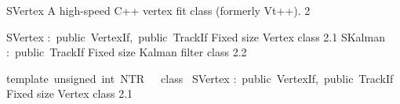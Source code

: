 \documentclass{article}
\begin{document}
\begin{cxxentry}
{}
        {SVertex}
        {}
        {A high-speed C++ vertex fit class (formerly Vt++).
}
        {2}
\begin{cxxnames}
        {SVertex}
        {:\ public\ VertexIf,\ public\ TrackIf}
        {Fixed size Vertex class}
        {2.1}
        {SKalman}
        {:\ public\ TrackIf}
        {Fixed size Kalman filter class}
        {2.2}
\end{cxxnames}
\begin{cxxdoc}

\end{cxxdoc}
\begin{cxxclass}
{template\ \<unsigned\ int\ NTR\>\ \ \ class\ }
        {SVertex}
        {:\ public\ VertexIf,\ public\ TrackIf}
        {Fixed size Vertex class}
        {2.1}
\begin{cxxInheritance}

\end{cxxInheritance}
\end{cxxclass}
\end{cxxentry}
\end{document}
